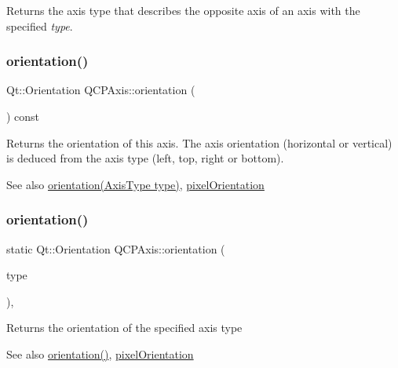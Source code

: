 Returns the axis type that describes the opposite axis of an axis with the specified {\itshape type}. \mbox{\label{classQCPAxis_ab988ef4538e2655bb77bd138189cd42e}} 
\subsubsection{\texorpdfstring{orientation()}{orientation()}\hspace{0.1cm}{\footnotesize\ttfamily [1/2]}}
{\footnotesize\ttfamily Qt\+::\+Orientation Q\+C\+P\+Axis\+::orientation (\begin{DoxyParamCaption}{ }\end{DoxyParamCaption}) const\hspace{0.3cm}{\ttfamily [inline]}}

Returns the orientation of this axis. The axis orientation (horizontal or vertical) is deduced from the axis type (left, top, right or bottom).

\begin{DoxySeeAlso}{See also}
\hyperlink{classQCPAxis_a9a68b3e45f1b1e33d4d807822342516c}{orientation(\+Axis\+Type type)}, \hyperlink{classQCPAxis_a45c45bed7e5666683b8d56afa66fa51f}{pixel\+Orientation} 
\end{DoxySeeAlso}
\mbox{\label{classQCPAxis_a9a68b3e45f1b1e33d4d807822342516c}} 
\subsubsection{\texorpdfstring{orientation()}{orientation()}\hspace{0.1cm}{\footnotesize\ttfamily [2/2]}}
{\footnotesize\ttfamily static Qt\+::\+Orientation Q\+C\+P\+Axis\+::orientation (\begin{DoxyParamCaption}\item[{\hyperlink{classQCPAxis_ae2bcc1728b382f10f064612b368bc18a}{Axis\+Type}}]{type }\end{DoxyParamCaption})\hspace{0.3cm}{\ttfamily [inline]}, {\ttfamily [static]}}

Returns the orientation of the specified axis type

\begin{DoxySeeAlso}{See also}
\hyperlink{classQCPAxis_ab988ef4538e2655bb77bd138189cd42e}{orientation()}, \hyperlink{classQCPAxis_a45c45bed7e5666683b8d56afa66fa51f}{pixel\+Orientation} 
\end{DoxySeeAlso}
\mbox{\label{classQCPAxis_a45c45bed7e5666683b8d56afa66fa51f}} 
